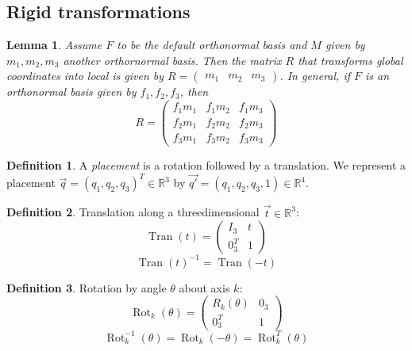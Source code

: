 \documentclass{article}
\newtheorem{lemma}{Lemma}[section]
\theoremstyle{definition}
\newtheorem{definition}{Definition}[section]
\DeclareMathOperator{\Tran}{Tran}
\DeclareMathOperator{\Rot}{Rot}
\begin{document}
\subsection{Rigid transformations}
\begin{lemma}
Assume $F$ to be the default orthonormal basis and $M$ given by $m_1, m_2, m_3$ another orthornormal basis. Then the matrix $R$ that transforms global coordinates into local is given by $R = \begin{pmatrix} m_1 & m_2 & m_3 \end{pmatrix}$.\newline
In general, if $F$ is an orthonormal basis given by $f_1, f_2, f_3$, then
\begin{equation*}
R = \begin{pmatrix}
f_1m_1 & f_1m_2 & f_1m_3 \\
f_2m_1 & f_2m_2 & f_2m_3 \\
f_3m_1 & f_3m_2 & f_3m_3
\end{pmatrix}
\end{equation*}
\end{lemma}

\begin{definition}
A \emph{placement} is a rotation followed by a translation. We represent a placement $\vec{q} = (q_1, q_2, q_3)^T \in \mathbb{R}^3$ by $\vec{q'} = (q_1, q_2, q_3, 1) \in \mathbb{R}^4$.
\end{definition}

\begin{definition}
Translation along a threedimensional $\vec{t} \in \mathbb{R}^3$:
\begin{equation*}
\Tran(t) = \begin{pmatrix}
I_3 & t \\
0_3^T & 1
\end{pmatrix}
\end{equation*}
\begin{equation*}
\Tran(t)^{-1} = \Tran(-t)
\end{equation*}
\end{definition}

\begin{definition}
Rotation by angle $\theta$ about axis $k$:
\begin{equation*}
\Rot_k(\theta) = \begin{pmatrix}
R_k(\theta) & 0_3 \\
0_3^T & 1
\end{pmatrix}
\end{equation*}
\begin{equation*}
\Rot_k^{-1}(\theta) = \Rot_k(-\theta) = \Rot_k^T(\theta)
\end{equation*}
\end{definition}
\end{document}
